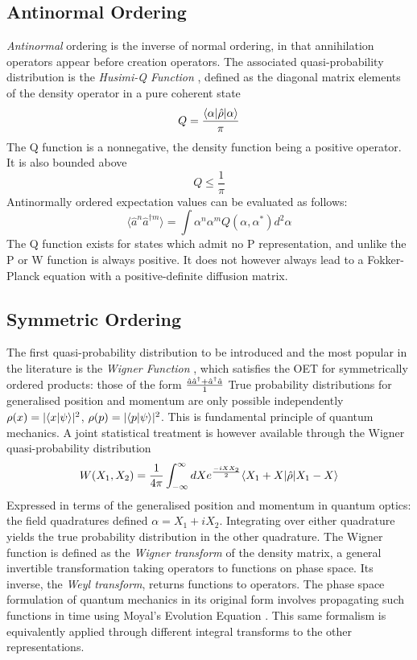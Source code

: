 \subsection{Antinormal Ordering}
\emph{Antinormal} ordering is the inverse of normal ordering, in that annihilation operators appear before creation operators.
The associated quasi-probability distribution is the \emph{Husimi-Q Function} \cite{Husimi1940}, defined as the diagonal matrix elements of the density operator in a pure coherent state
\begin{equation}
	Q = \frac{\langle \alpha | \hat{\rho} | \alpha \rangle}{\pi}
	\label{qdef}
\end{equation}
The Q function is a nonnegative, the density function being a positive operator.
It is also bounded above
\begin{equation}
	Q \leq \frac{1}{\pi}
\end{equation}
Antinormally ordered expectation values can be evaluated as follows:
\begin{equation}
	\langle \hat{a}^n \hat{a}^{\dagger m}  \rangle = \int \alpha^n \alpha^m Q (\alpha, \alpha^*) d^2 \alpha
\end{equation}
The Q function exists for states which admit no P representation, and unlike the P or W function is always positive.
It does not however always lead to a Fokker-Planck equation with a positive-definite diffusion matrix. 
\subsection{Symmetric Ordering}
The first quasi-probability distribution to be introduced and the most popular in the literature is the \emph{Wigner Function} \cite{Wigner1932} , which satisfies the OET for symmetrically ordered products: those of the form $\frac{\hat{a} \hat{a}^\dagger + \hat{a}^\dagger \hat{a}}{1}$
True probability distributions for generalised position and momentum are only possible independently $\rho(x) = |\langle x | \psi \rangle|^2$, $\rho(p) = |\langle p | \psi \rangle|^2$.
This is fundamental principle of quantum mechanics.
A joint statistical treatment is however available through the Wigner quasi-probability distribution
\begin{equation}
	W(X_1, X_2) = \frac{1}{4 \pi} \int_{-\infty}^\infty dX e^{\frac{-iXX_2}{2}} \langle X_1+X | \hat{\rho} | X_1-X \rangle
\end{equation}
Expressed in terms of the generalised position and momentum in quantum optics: the field quadratures defined $\alpha = X_1 + iX_2$.
Integrating over either quadrature yields the true probability distribution in the other quadrature.
The Wigner function is defined as the \emph{Wigner transform} of the density matrix, a general invertible transformation taking operators to functions on phase space.
Its inverse, the \emph{Weyl transform}, returns functions to operators.
The phase space formulation of quantum mechanics in its original form involves propagating such functions in time using Moyal's Evolution Equation \cite{Curtright2011}.
This same formalism is equivalently applied  through different integral transforms to the other representations.
